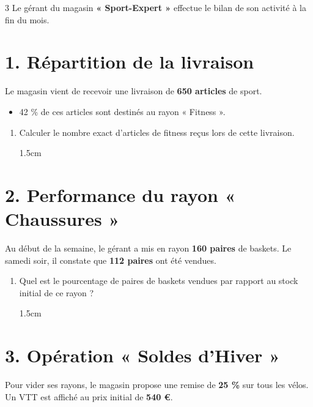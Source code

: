 \documentclass[a4paper]{book}
\begin{document}
{    \begin{exerciceNote}{3}
        \noindent Le gérant du magasin \textbf{« Sport-Expert »} effectue le bilan de son activité à la fin du mois.
    
        \section*{1. Répartition de la livraison}
        Le magasin vient de recevoir une livraison de \textbf{650 articles} de sport.
        \begin{itemize}[label=\textbullet]
            \item 42 \% de ces articles sont destinés au rayon « Fitness ».
        \end{itemize}
        
        \begin{enumerate}[leftmargin=*]
            \item Calculer le nombre exact d'articles de fitness reçus lors de cette livraison.

            \begin{ZoneReponse}{1.5cm}                
            \end{ZoneReponse}
        \end{enumerate}
        
        \section*{2. Performance du rayon « Chaussures »}
        Au début de la semaine, le gérant a mis en rayon \textbf{160 paires} de baskets. Le samedi soir, il constate que \textbf{112 paires} ont été vendues.
        
        \begin{enumerate}[resume, leftmargin=*]
            \item Quel est le pourcentage de paires de baskets vendues par rapport au stock initial de ce rayon ?
    
            \begin{ZoneReponse}{1.5cm}                
            \end{ZoneReponse}
        \end{enumerate}
        
        \section*{3. Opération « Soldes d'Hiver »}
        Pour vider ses rayons, le magasin propose une remise de \textbf{25 \%} sur tous les vélos. Un VTT est affiché au prix initial de \textbf{540 \euro}.


\end{exerciceNote}}
\end{document}
